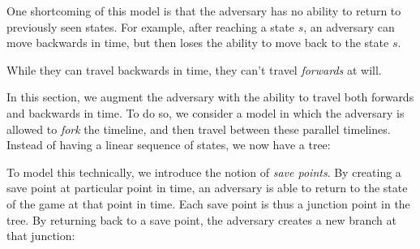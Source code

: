 One shortcoming of this model is that the adversary has no ability to
return to previously seen states.
For example, after reaching a state $s$, an adversary can move backwards
in time, but then loses the ability to move back to the state $s$.

While they can travel backwards in time, they can't travel \emph{forwards}
at will.

In this section, we augment the adversary with the ability to travel both
forwards and backwards in time.
To do so, we consider a model in which the adversary is allowed
to \emph{fork} the timeline, and then travel between these parallel timelines.
Instead of having a linear sequence of states, we now have a tree:

\begin{figure}[H]
\centering
{}
\end{figure}

To model this technically, we introduce the notion of \emph{save points}.
By creating a save point at particular point in time, an adversary is
able to return to the state of the game at that point in time.
Each save point is thus a junction point in the tree.
By returning back to a save point, the adversary creates a new branch
at that junction:

